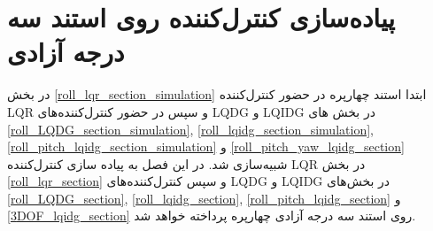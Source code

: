 \chapter{پیاده‌سازی کنترل‌کننده روی استند سه درجه آزادی}

 در بخش
\ref{roll_lqr_section_simulation}
ابتدا  استند چهارپره در حضور کنترل‌کننده LQR و سپس در حضور کنترل‌کننده‌های LQDG و LQIDG در بخش های
\ref{roll_LQDG_section_simulation},
\ref{roll_lqidg_section_simulation},
\ref{roll_pitch_lqidg_section_simulation}
و
\ref{roll_pitch_yaw_lqidg_section}
شبیه‌سازی شد.
در این فصل به پیاده سازی کنترل‌کننده LQR در بخش
\ref{roll_lqr_section}
و سپس کنترل‌کننده‌های LQDG و LQIDG در بخش‌های 
\ref{roll_LQDG_section},
\ref{roll_lqidg_section},
\ref{roll_pitch_lqidg_section}
و
\ref{3DOF_lqidg_section}
روی استند سه درجه آزادی چهارپره پرداخته خواهد‌ شد.
